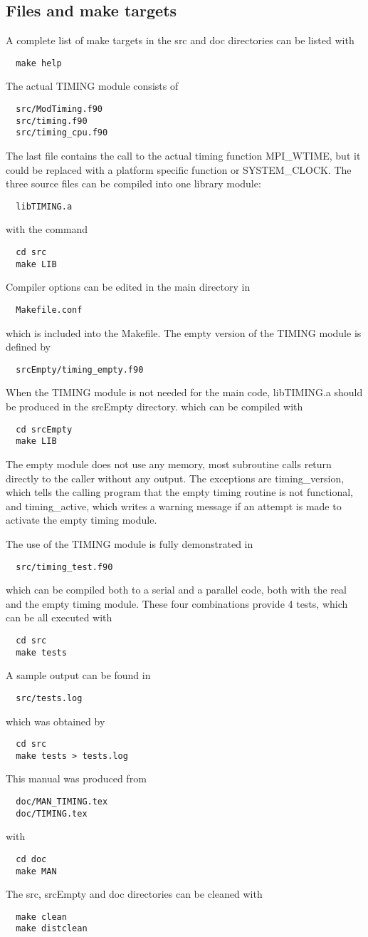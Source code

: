 \newpage
\subsection{Files and make targets}

A complete list of make targets in the src and doc directories
can be listed with
\begin{verbatim}
  make help
\end{verbatim}
The actual TIMING module consists of
\begin{verbatim}
  src/ModTiming.f90
  src/timing.f90
  src/timing_cpu.f90
\end{verbatim}
The last file contains the call to the actual timing function MPI\_WTIME, 
but it could be replaced with a platform specific function or SYSTEM\_CLOCK.
The three source files can be compiled into one library module:
\begin{verbatim}
  libTIMING.a
\end{verbatim}
with the command
\begin{verbatim}
  cd src
  make LIB
\end{verbatim}
Compiler options can be edited in the main directory in
\begin{verbatim}
  Makefile.conf
\end{verbatim}
which is included into the Makefile.
The empty version of the TIMING module is defined by
\begin{verbatim}
  srcEmpty/timing_empty.f90
\end{verbatim}
When the TIMING module is not needed for the main code, 
libTIMING.a should be produced in the srcEmpty directory.
which can be compiled with
\begin{verbatim}
  cd srcEmpty
  make LIB
\end{verbatim}
The empty module does not use any memory, most subroutine calls 
return directly to the caller without any output. The exceptions
are timing\_version, which tells the calling program that the
empty timing routine is not functional, and timing\_active, which
writes a warning message if an attempt is made to activate 
the empty timing module.

The use of the TIMING module is fully demonstrated in 
\begin{verbatim}
  src/timing_test.f90
\end{verbatim}
which can be compiled both to a serial and a parallel code, both with
the real and the empty timing module. These four combinations
provide 4 tests, which can be all executed with
\begin{verbatim}
  cd src
  make tests
\end{verbatim}
A sample output can be found in
\begin{verbatim}
  src/tests.log
\end{verbatim}
which was obtained by
\begin{verbatim}
  cd src
  make tests > tests.log
\end{verbatim}

This manual was produced from
\begin{verbatim}
  doc/MAN_TIMING.tex
  doc/TIMING.tex
\end{verbatim}
with
\begin{verbatim}
  cd doc
  make MAN
\end{verbatim}
The src, srcEmpty and doc directories can be cleaned with
\begin{verbatim}
  make clean
  make distclean
\end{verbatim}
